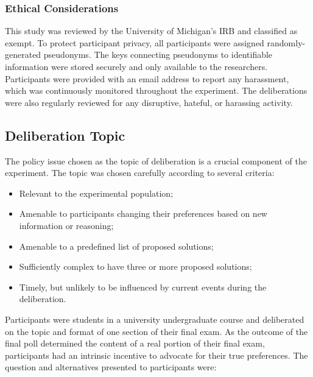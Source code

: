 \subsubsection{Ethical Considerations}
This study was reviewed by the University of Michigan's IRB and classified as exempt.
To protect participant privacy, all participants were assigned randomly-generated pseudonyms.
The keys connecting pseudonyms to identifiable information were stored securely and only available
to the researchers.
Participants were provided with an email address to report any harassment, which was continuously
monitored throughout the experiment.
The deliberations were also regularly reviewed for any disruptive, hateful, or harassing activity.


\subsection{Deliberation Topic}
The policy issue chosen as the topic of deliberation is a crucial component
of the experiment.
The topic was chosen carefully according to several criteria:
\begin{itemize}
\item Relevant to the experimental population;
\item Amenable to participants changing their preferences based on new information or reasoning;
\item Amenable to a predefined list of proposed solutions;
\item Sufficiently complex to have three or more proposed solutions;
\item Timely, but unlikely to be influenced by current events during the deliberation.
\end{itemize}

Participants were students in a university undergraduate course and deliberated on the topic and format of one section of their final exam.
As the outcome of the final poll determined the content of a real portion of their final exam, participants had an intrinsic incentive to advocate for their true preferences.
The question and alternatives presented to participants were:

